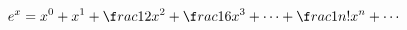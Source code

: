 \documentclass[preview]{standalone}
\begin{document}
\begin{align*}
e^x = x^0 + x^1 + \f r ac{1}{2} x^2 + \f r ac{1}{6} x^3 + \cdots + \f r ac{1}{n!} x^n + \cdots
\end{align*}
\end{document}
